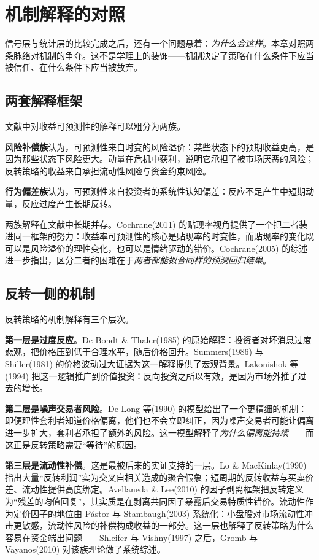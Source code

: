 \section{机制解释的对照}\label{sec:mechanism}

信号层与统计层的比较完成之后，还有一个问题悬着：\emph{为什么会这样}。本章对照两条脉络对机制的争夺。这不是学理上的装饰——机制决定了策略在什么条件下应当被信任、在什么条件下应当被放弃。

\subsection{两套解释框架}

文献中对收益可预测性的解释可以粗分为两族。

\textbf{风险补偿族}认为，可预测性来自时变的风险溢价：某些状态下的预期收益更高，是因为那些状态下风险更大。动量在危机中获利，说明它承担了被市场厌恶的风险；反转策略的收益来自承担流动性风险与资金约束风险。

\textbf{行为偏差族}认为，可预测性来自投资者的系统性认知偏差：反应不足产生中短期动量，反应过度产生长期反转。

两族解释在文献中长期并存。Cochrane(2011) 的贴现率视角提供了一个把二者装进同一框架的努力：收益率可预测性的核心是贴现率的时变性，而贴现率的变化既可以是风险溢价的理性变化，也可以是情绪驱动的错价\cite{cochrane2011}。Cochrane(2005) 的综述进一步指出，区分二者的困难在于\emph{两者都能拟合同样的预测回归结果}\cite{cochrane2005}。

\subsection{反转一侧的机制}

反转策略的机制解释有三个层次。

\textbf{第一层是过度反应}。De Bondt \& Thaler(1985) 的原始解释：投资者对坏消息过度悲观，把价格压到低于合理水平，随后价格回升\cite{debondt1985}。Summers(1986) 与 Shiller(1981) 的价格波动过大证据为这一解释提供了宏观背景\cite{summers1986,shiller1981}。Lakonishok 等(1994) 把这一逻辑推广到价值投资：反向投资之所以有效，是因为市场外推了过去的增长\cite{lakonishok1994}。

\textbf{第二层是噪声交易者风险}。De Long 等(1990) 的模型给出了一个更精细的机制：即便理性套利者知道价格偏离，他们也不会立即纠正，因为噪声交易者可能让偏离进一步扩大，套利者承担了额外的风险\cite{delong1990}。这一模型解释了\emph{为什么偏离能持续}——而这正是反转策略需要“等待”的原因。

\textbf{第三层是流动性补偿}。这是最被后来的实证支持的一层。Lo \& MacKinlay(1990) 指出大量“反转利润”实为交叉自相关造成的聚合假象\cite{lomackinlay1990}；短周期的反转收益与买卖价差、流动性提供高度绑定。Avellaneda \& Lee(2010) 的因子剥离框架把反转定义为“残差的均值回复”，其实质是在剥离共同因子暴露后交易特质性错价\cite{avellaneda2010}。流动性作为定价因子的地位由 Pástor 与 Stambaugh(2003) 系统化：小盘股对市场流动性冲击更敏感，流动性风险的补偿构成收益的一部分\cite{pastorstambaugh2003}。这一层也解释了反转策略为什么容易在资金端出问题——Shleifer 与 Vishny(1997) 之后，Gromb 与 Vayanos(2010) 对该族理论做了系统综述\cite{shleifervishny1997,grombvayanos2010}。

